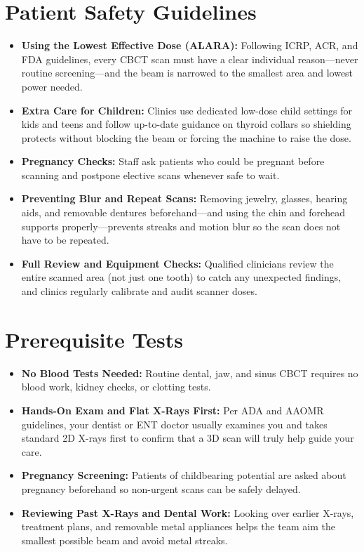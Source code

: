 \section{Patient Safety Guidelines}
\begin{itemize}
    \item \textbf{Using the Lowest Effective Dose (ALARA):} Following ICRP, ACR, and FDA guidelines, every CBCT scan must have a clear individual reason---never routine screening---and the beam is narrowed to the smallest area and lowest power needed.
    \item \textbf{Extra Care for Children:} Clinics use dedicated low-dose child settings for kids and teens and follow up-to-date guidance on thyroid collars so shielding protects without blocking the beam or forcing the machine to raise the dose.
    \item \textbf{Pregnancy Checks:} Staff ask patients who could be pregnant before scanning and postpone elective scans whenever safe to wait.
    \item \textbf{Preventing Blur and Repeat Scans:} Removing jewelry, glasses, hearing aids, and removable dentures beforehand---and using the chin and forehead supports properly---prevents streaks and motion blur so the scan does not have to be repeated.
    \item \textbf{Full Review and Equipment Checks:} Qualified clinicians review the entire scanned area (not just one tooth) to catch any unexpected findings, and clinics regularly calibrate and audit scanner doses.
\end{itemize}

\section{Prerequisite Tests}
\begin{itemize}
    \item \textbf{No Blood Tests Needed:} Routine dental, jaw, and sinus CBCT requires no blood work, kidney checks, or clotting tests.
    \item \textbf{Hands-On Exam and Flat X-Rays First:} Per ADA and AAOMR guidelines, your dentist or ENT doctor usually examines you and takes standard 2D X-rays first to confirm that a 3D scan will truly help guide your care.
    \item \textbf{Pregnancy Screening:} Patients of childbearing potential are asked about pregnancy beforehand so non-urgent scans can be safely delayed.
    \item \textbf{Reviewing Past X-Rays and Dental Work:} Looking over earlier X-rays, treatment plans, and removable metal appliances helps the team aim the smallest possible beam and avoid metal streaks.
\end{itemize}

